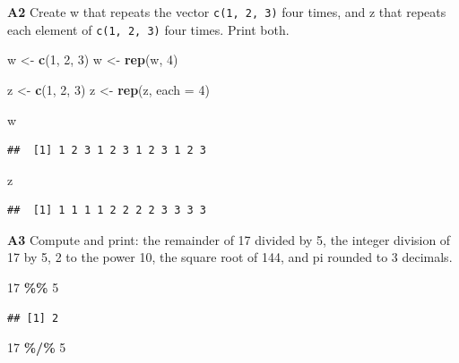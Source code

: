\documentclass[
]{article}
\newenvironment{Shaded}{\begin{snugshade}}{\end{snugshade}}
\newcommand{\AttributeTok}[1]{\textcolor[rgb]{0.13,0.29,0.53}{#1}}
\newcommand{\DecValTok}[1]{\textcolor[rgb]{0.00,0.00,0.81}{#1}}
\newcommand{\FunctionTok}[1]{\textcolor[rgb]{0.13,0.29,0.53}{\textbf{#1}}}
\newcommand{\NormalTok}[1]{#1}
\newcommand{\OtherTok}[1]{\textcolor[rgb]{0.56,0.35,0.01}{#1}}
\newcommand{\SpecialCharTok}[1]{\textcolor[rgb]{0.81,0.36,0.00}{\textbf{#1}}}
\begin{document}
\textbf{A2} Create w that repeats the vector \texttt{c(1,\ 2,\ 3)} four
times, and z that repeats each element of \texttt{c(1,\ 2,\ 3)} four
times. Print both.

\begin{Shaded}
\begin{Highlighting}[]
\NormalTok{w }\OtherTok{\textless{}{-}} \FunctionTok{c}\NormalTok{(}\DecValTok{1}\NormalTok{, }\DecValTok{2}\NormalTok{, }\DecValTok{3}\NormalTok{)}
\NormalTok{w }\OtherTok{\textless{}{-}} \FunctionTok{rep}\NormalTok{(w, }\DecValTok{4}\NormalTok{)}

\NormalTok{z }\OtherTok{\textless{}{-}} \FunctionTok{c}\NormalTok{(}\DecValTok{1}\NormalTok{, }\DecValTok{2}\NormalTok{, }\DecValTok{3}\NormalTok{)}
\NormalTok{z }\OtherTok{\textless{}{-}} \FunctionTok{rep}\NormalTok{(z, }\AttributeTok{each =} \DecValTok{4}\NormalTok{)}

\NormalTok{w}
\end{Highlighting}
\end{Shaded}

\begin{verbatim}
##  [1] 1 2 3 1 2 3 1 2 3 1 2 3
\end{verbatim}

\begin{Shaded}
\begin{Highlighting}[]
\NormalTok{z}
\end{Highlighting}
\end{Shaded}

\begin{verbatim}
##  [1] 1 1 1 1 2 2 2 2 3 3 3 3
\end{verbatim}

\textbf{A3} Compute and print: the remainder of 17 divided by 5, the
integer division of 17 by 5, 2 to the power 10, the square root of 144,
and pi rounded to 3 decimals.

\begin{Shaded}
\begin{Highlighting}[]
\DecValTok{17} \SpecialCharTok{\%\%} \DecValTok{5}
\end{Highlighting}
\end{Shaded}

\begin{verbatim}
## [1] 2
\end{verbatim}

\begin{Shaded}
\begin{Highlighting}[]
\DecValTok{17} \SpecialCharTok{\%/\%} \DecValTok{5}
\end{Highlighting}
\end{Shaded}
\end{document}
